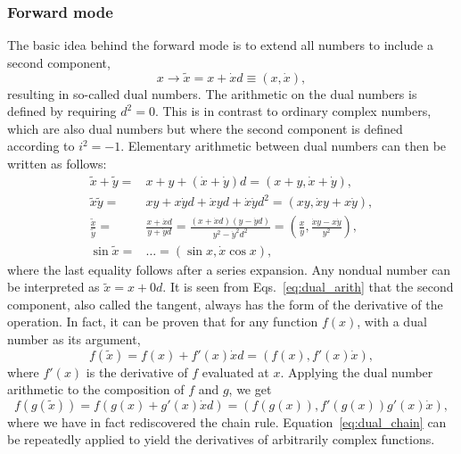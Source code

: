 \documentclass{article}
\begin{document}
\subsubsection{Forward mode}

The basic idea behind the forward mode is to extend all numbers to include a second component,
\begin{equation}
  \label{eq:ddouble}
  x \rightarrow \tilde x = x + \dot x d \equiv (x,\dot x),
\end{equation}
resulting in so-called dual numbers. The arithmetic on the dual numbers is defined by requiring $d^2=0$. This is in contrast to ordinary complex numbers, which are also dual numbers but where the second component is defined according to $i^2=-1$. Elementary arithmetic between dual numbers can then be written as follows:
\begin{equation}
  \label{eq:dual_arith}
  \begin{split}
    \tilde x + \tilde y =& x + y + (\dot x + \dot y)d = (x+y, \dot x +
    \dot y), \\
    \tilde x\tilde y =& xy + x\dot yd + \dot xyd + \dot x\dot yd^2 =
    (xy, \dot xy + x\dot y), \\
    \frac{\tilde x}{\tilde y} =& \frac{x + \dot xd}{y + \dot yd} =
    \frac{(x + \dot xd)(y - \dot yd)}{y^2 - \dot y^2 d^2} =
    \left(\frac{x}{y}, \frac{\dot xy - x\dot y}{y^2} \right), \\
    \sin\tilde x =& \ldots = (\sin x, \dot x\cos x),
  \end{split}
\end{equation}
where the last equality follows after a series expansion. Any nondual number can be interpreted as $\tilde x=x+0d$. It is seen from Eqs.~\eqref{eq:dual_arith} that the second component, also called the tangent, always has the form of the derivative of the operation. In fact, it can be proven that for any function $f(x)$, with a dual number as its argument,
\begin{equation}
  \label{eq:dual_general}
  f(\tilde x) = f(x) + f'(x)\dot xd = \left( f(x), f'(x)\dot x
  \right),
\end{equation}
where $f'(x)$ is the derivative of $f$ evaluated at $x$. Applying the dual number arithmetic to the composition of $f$ and $g$, we get
\begin{equation}
  \label{eq:dual_chain}
  f(g(\tilde x)) = f(g(x) + g'(x)\dot xd) = \left( f(g(x)),
    f'(g(x))g'(x)\dot x \right),
\end{equation}
where we have in fact rediscovered the chain rule. Equation~\eqref{eq:dual_chain} can be repeatedly applied to yield the derivatives of arbitrarily complex functions.
\end{document}
